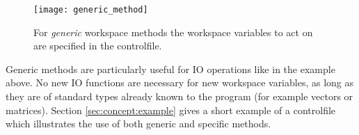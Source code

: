\begin{figure}
  \begin{center}
    \texttt{[image: generic\_method]}
    \caption{For \emph{generic}
      workspace methods the workspace variables to act on are
        specified in the controlfile.}
    \label{fig:generic_method}
  \end{center}
\end{figure}

Generic methods are particularly useful for IO operations like in the
example above. No new IO functions are necessary for new workspace
variables, as long as they are of standard types already known to the
program (for example vectors or matrices).  Section
\ref{sec:concept:example} gives a short example of a controlfile which
illustrates the use of both generic and specific methods.

\label{sec:concept:example}

